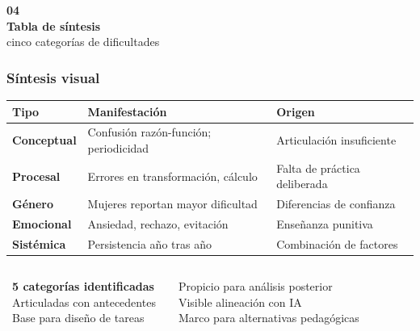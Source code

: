 \documentclass[11pt, aspectratio=169, spanish]{beamer}
\begin{document}
\begin{frame}[plain]
\vspace*{1.0cm}
\begin{center}
{\fontsize{40}{48}\selectfont\textcolor{VerdeUNAL!40}{\textbf{04}}}\\[-0.1cm]
{\Large\textbf{Tabla de síntesis}}\\[0.05cm]
{\normalsize\textcolor{GrisClaro!80!black}{cinco categorías de dificultades}}
\end{center}
\end{frame}

\begin{frame}[plain, shrink=18]
\frametitle{\faTable\quad Síntesis visual}
\vspace{0.05cm}

\begin{tcolorbox}[colback=GrisFondo, colframe=GrisClaro, arc=2mm]
{\tiny
\centering
\begin{tabular}{|l|p{2.2cm}|p{2.8cm}|}
\hline
\textbf{\small Tipo} & \textbf{\small Manifestación} & \textbf{\small Origen} \\
\hline
\textbf{Conceptual} & Confusión razón-función; periodicidad & Articulación insuficiente \\
\hline
\textbf{Procesal} & Errores en transformación, cálculo & Falta de práctica deliberada \\
\hline
\textbf{Género} & Mujeres reportan mayor dificultad & Diferencias de confianza \\
\hline
\textbf{Emocional} & Ansiedad, rechazo, evitación & Enseñanza punitiva \\
\hline
\textbf{Sistémica} & Persistencia año tras año & Combinación de factores \\
\hline
\end{tabular}
}
\end{tcolorbox}

\vspace{0.12cm}

\begin{columns}[T]
\begin{tcolorbox}[colback=AzulInfo!5, colframe=AzulInfo!60, arc=2mm, boxrule=0.8pt]
{\scriptsize
\faSquare\, \textbf{5 categorías identificadas}\\
\faSquare\, Articuladas con antecedentes\\
\faSquare\, Base para diseño de tareas
}
\end{tcolorbox}

\begin{tcolorbox}[colback=VerdeOk!5, colframe=VerdeOk!60, arc=2mm, boxrule=0.8pt]
{\scriptsize
\faSquare\, Propicio para análisis posterior\\
\faSquare\, Visible alineación con IA\\
\faSquare\, Marco para alternativas pedagógicas
}
\end{tcolorbox}
\end{columns}

\end{frame}
\end{document}
